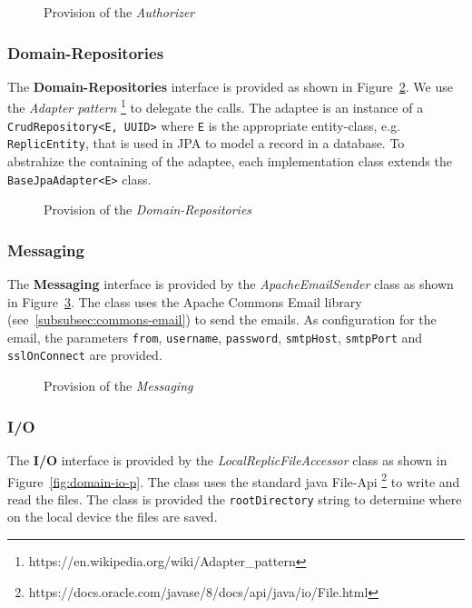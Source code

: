 \begin{figure}
    \centering

    \caption{Provision of the \textit{Authorizer}}
    \label{fig:inter-authorizer-p}
\end{figure}

\subsubsection{Domain-Repositories}
The \textbf{Domain-Repositories} interface is provided as shown in Figure~\ref{fig:domain-repositories-p}.
We use the \textit{Adapter pattern} \footnote{https://en.wikipedia.org/wiki/Adapter\_pattern} to delegate the calls. \newline
The adaptee is an instance of a \texttt{CrudRepository<E, UUID>} where \texttt{E} is the appropriate entity-class, e.g. \texttt{ReplicEntity}, that is used in JPA to model a record in a database.
To abstrahize the containing of the adaptee, each implementation class extends the \texttt{BaseJpaAdapter<E>} class.

\begin{figure}
    \centering

    \caption{Provision of the \textit{Domain-Repositories}}
    \label{fig:domain-repositories-p}
\end{figure}

\subsubsection{Messaging}
The \textbf{Messaging} interface is provided by the \textit{ApacheEmailSender} class as shown in Figure~\ref{fig:domain-messaging-p}.
The class uses the Apache Commons Email library (see~\ref{subsubsec:commons-email}) to send the emails.
As configuration for the email, the parameters \texttt{from}, \texttt{username}, \texttt{password}, \texttt{smtpHost}, \texttt{smtpPort} and \texttt{sslOnConnect} are provided.

\begin{figure}
    \centering

    \caption{Provision of the \textit{Messaging}}
    \label{fig:domain-messaging-p}
\end{figure}

\subsubsection{I/O}
The \textbf{I/O} interface is provided by the \textit{LocalReplicFileAccessor} class as shown in Figure~\ref{fig:domain-io-p}.
The class uses the standard java File-Api \footnote{https://docs.oracle.com/javase/8/docs/api/java/io/File.html} to write and read the files.
The class is provided the \texttt{rootDirectory} string to determine where on the local device the files are saved.

